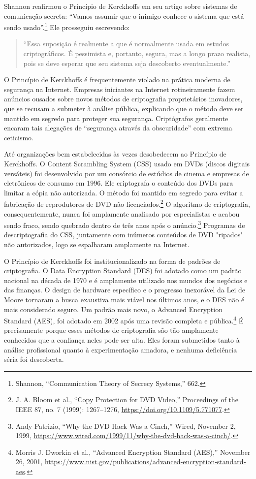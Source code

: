 \documentclass{book}
\begin{document}
Shannon reafirmou o Princípio de Kerckhoffs em seu artigo sobre sistemas de comunicação secreta: ``Vamos assumir que o inimigo conhece o sistema que está sendo usado''.\footnote{Shannon, “Communication Theory of Secrecy Systems,” 662.} Ele prosseguiu escrevendo:
\begin{quote}
    ``Essa suposição é realmente a que é normalmente usada em estudos criptográficos. É pessimista e, portanto, segura, mas a longo prazo realista, pois se deve esperar que seu sistema seja descoberto eventualmente.''
\end{quote}


O Princípio de Kerckhoffs é frequentemente violado na prática moderna de segurança na Internet. Empresas iniciantes na Internet rotineiramente fazem anúncios ousados sobre novos métodos de criptografia proprietários inovadores, que se recusam a submeter à análise pública, explicando que o método deve ser mantido em segredo para proteger sua segurança. Criptógrafos geralmente encaram tais alegações de ``segurança através da obscuridade'' com extrema ceticismo.

Até organizações bem estabelecidas às vezes desobedecem ao Princípio de Kerckhoffs. O Content Scrambling System (CSS) usado em DVDs (discos digitais versáteis) foi desenvolvido por um consórcio de estúdios de cinema e empresas de eletrônicos de consumo em 1996. Ele criptografa o conteúdo dos DVDs para limitar a cópia não autorizada. O método foi mantido em segredo para evitar a fabricação de reprodutores de DVD não licenciados.\footnote{J. A. Bloom et al., “Copy Protection for DVD Video,” Proceedings of the IEEE 87, no. 7 (1999): 1267–1276, \url{https://doi.org/10.1109/5.771077}.} O algoritmo de criptografia, consequentemente, nunca foi amplamente analisado por especialistas e acabou sendo fraco, sendo quebrado dentro de três anos após o anúncio.\footnote{Andy Patrizio, “Why the DVD Hack Was a Cinch,” Wired, November 2, 1999, \url{https://www.wired.com/1999/11/why‐the‐dvd‐hack‐was‐a‐cinch/}.} Programas de descriptografia do CSS, juntamente com inúmeros conteúdos de DVD "ripados" não autorizados, logo se espalharam amplamente na Internet.

O Princípio de Kerckhoffs foi institucionalizado na forma de padrões de criptografia. O Data Encryption Standard (DES) foi adotado como um padrão nacional na década de 1970 e é amplamente utilizado nos mundos dos negócios e das finanças. O design de hardware específico e o progresso inexorável da Lei de Moore tornaram a busca exaustiva mais viável nos últimos anos, e o DES não é mais considerado seguro. Um padrão mais novo, o Advanced Encryption Standard (AES), foi adotado em 2002 após uma revisão completa e pública.\footnote{Morris J. Dworkin et al., “Advanced Encryption Standard (AES),” November 26, 2001, \url{https://www.nist.gov/publications/advanced‐encryption‐standard‐aes}.} É precisamente porque esses métodos de criptografia são tão amplamente conhecidos que a confiança neles pode ser alta. Eles foram submetidos tanto à análise profissional quanto à experimentação amadora, e nenhuma deficiência séria foi descoberta.
\end{document}
